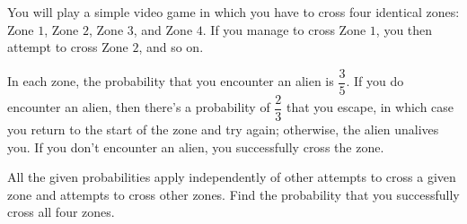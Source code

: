 You will play a simple video game in which you have to cross four identical zones: Zone $1$, Zone $2$, Zone $3$, and Zone $4$. If you manage to cross Zone $1$, you then attempt to cross Zone $2$, and so on.



In each zone, the probability that you encounter an alien is $\dfrac{3}{5}$. If you do encounter an alien, then there's a probability of $\dfrac{2}{3}$ that you escape, in which case you return to the start of the zone and try again; otherwise, the alien unalives you. If you don't encounter an alien, you successfully cross the zone.



All the given probabilities apply independently of other attempts to cross a given zone and attempts to cross other zones. Find the probability that you successfully cross all four zones.

